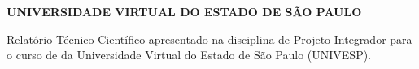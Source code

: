 \begin{center}

{\large\bfseries UNIVERSIDADE VIRTUAL DO ESTADO DE SÃO PAULO}

\vspace{8cm}

{\large\bfseries \doctitulo}

\end{center}

\vspace{3cm}

\hfill\begin{minipage}{0.5\textwidth}
\singlespacing
Relatório Técnico-Científico apresentado na disciplina de Projeto Integrador para o curso
de \doccurso{} da Universidade Virtual do Estado de São Paulo (UNIVESP).
\end{minipage}

\vfill

\begin{center}
\docpolo\\
\docano
\end{center}

\vspace{1cm}

\clearpage
